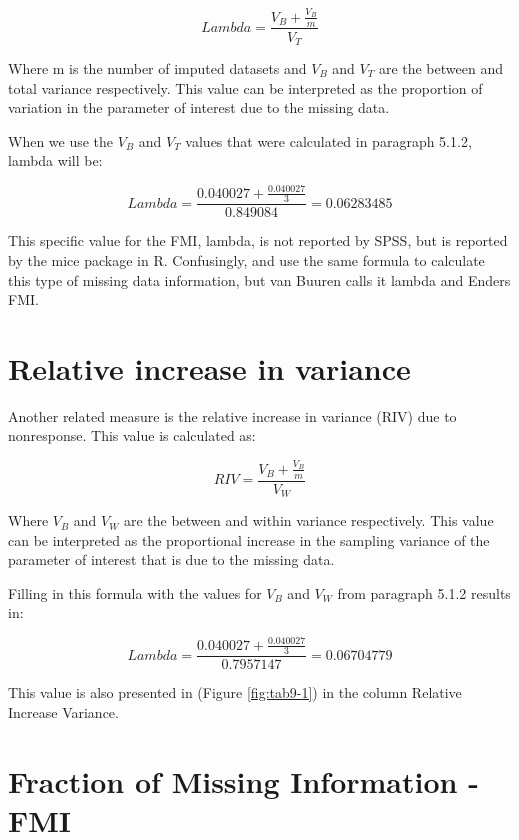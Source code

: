\documentclass[
]{book}
\begin{document}
\begin{equation}
Lambda = \frac{V_B + \frac{V_B}{m}}{V_T}
  \label{eq:lambda}
\end{equation}

Where m is the number of imputed datasets and \({V_B}\) and \({V_T}\) are the between and total variance respectively. This value can be interpreted as the proportion of variation in the parameter of interest due to the missing data.

When we use the \({V_B}\) and \({V_T}\) values that were calculated in paragraph 5.1.2, lambda will be:

\[Lambda = \frac{0.040027 + \frac{0.040027}{3}}{0.849084}=0.06283485\]

This specific value for the FMI, lambda, is not reported by SPSS, but is reported by the mice package in R. Confusingly, \citet{VanBuuren2018} and \citet{enders2010applied} use the same formula to calculate this type of missing data information, but van Buuren calls it lambda and Enders FMI.

\hypertarget{relative-increase-in-variance}{%
\section{Relative increase in variance}\label{relative-increase-in-variance}}

Another related measure is the relative increase in variance (RIV) due to nonresponse. This value is calculated as:

\begin{equation}
RIV = \frac{V_B + \frac{V_B}{m}}{V_W}
  \label{eq:riv}
\end{equation}

Where \({V_B}\) and \({V_W}\) are the between and within variance respectively. This value can be interpreted as the proportional increase in the sampling variance of the parameter of interest that is due to the missing data.

Filling in this formula with the values for \({V_B}\) and \({V_W}\) from paragraph 5.1.2 results in:

\[Lambda = \frac{0.040027 + \frac{0.040027}{3}}{0.7957147}=0.06704779\]

This value is also presented in (Figure \ref{fig:tab9-1}) in the column Relative Increase Variance.

\hypertarget{fraction-of-missing-information---fmi}{%
\section{Fraction of Missing Information - FMI}\label{fraction-of-missing-information---fmi}}
\end{document}
